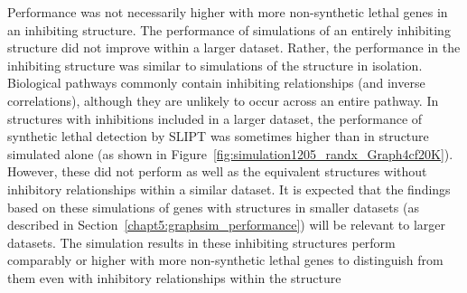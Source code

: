 Performance was not necessarily higher with more non-synthetic lethal genes in an inhibiting  structure. The performance of simulations of an entirely inhibiting  structure did not improve within a larger dataset. Rather, the performance in the inhibiting  structure was similar to simulations of the  structure in isolation. Biological pathways commonly contain inhibiting relationships (and inverse correlations), although they are unlikely to occur across an entire pathway.
%
In  structures with inhibitions included in a larger dataset, the performance of \gls{synthetic lethal} detection by \gls{SLIPT} was sometimes higher than in  structure simulated alone (as shown in Figure~\ref{fig:simulation1205_randx_Graph4cf20K}). %
However, these did not perform as well as the equivalent  structures without inhibitory relationships within a similar dataset.
%
It is expected that the findings based on these simulations of genes with  structures in smaller datasets (as described in Section~\ref{chapt5:graphsim_performance}) will be relevant to larger datasets. The simulation results in these inhibiting  structures  perform comparably or higher with more non-synthetic lethal genes to distinguish from them even with inhibitory relationships within the  structure 



